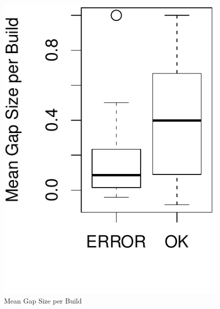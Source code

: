 \documentclass[12pt,oneside]{book}
\begin{document}
\begin{figure}[t]
\begin{minipage}[b]{0.4\linewidth}
	\centering	
	\includegraphics[scale=0.372]{figures/boxplot_meangapsize}
	\caption{Mean Gap Size per Build}
	\label{fig:gapsizes}
\end{minipage}
\hspace{0.5cm}
\begin{minipage}[b]{0.4\linewidth}
	\centering

\end{minipage}
\end{figure}
\end{document}
